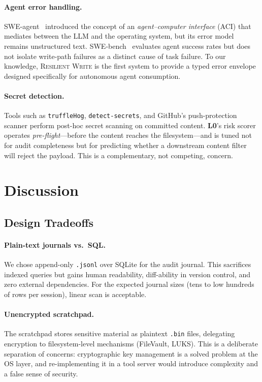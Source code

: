 \documentclass[11pt,twocolumn]{article}
\newcommand{\layer}[1]{\textbf{L#1}}
\begin{document}
\paragraph{Agent error handling.}
SWE-agent~\cite{yang2024sweagent} introduced the concept of an
\emph{agent--computer interface} (ACI) that mediates between the
LLM and the operating system, but its error model remains
unstructured text.  SWE-bench~\cite{jimenez2024swebench}
evaluates agent success rates but does not isolate write-path
failures as a distinct cause of task failure.  To our knowledge,
\textsc{Resilient Write} is the first system to provide a typed
error envelope designed specifically for autonomous agent
consumption.

\paragraph{Secret detection.}
Tools such as \texttt{truffleHog}, \texttt{detect-secrets}, and
GitHub's push-protection scanner perform post-hoc secret scanning
on committed content.  \layer{0}'s risk scorer operates
\emph{pre-flight}---before the content reaches the filesystem---and
is tuned not for audit completeness but for predicting whether a
downstream content filter will reject the payload.  This is a
complementary, not competing, concern.

\section{Discussion}
\label{sec:discussion}

\subsection{Design Tradeoffs}

\paragraph{Plain-text journals vs.\ SQL.}
We chose append-only \texttt{.jsonl} over SQLite for the audit
journal.  This sacrifices indexed queries but gains human
readability, diff-ability in version control, and zero external
dependencies.  For the expected journal sizes (tens to low hundreds
of rows per session), linear scan is acceptable.

\paragraph{Unencrypted scratchpad.}
The scratchpad stores sensitive material as plaintext
\texttt{.bin} files, delegating encryption to filesystem-level
mechanisms (FileVault, LUKS).  This is a deliberate separation
of concerns: cryptographic key management is a solved problem at
the OS layer, and re-implementing it in a tool server would
introduce complexity and a false sense of security.
\end{document}
